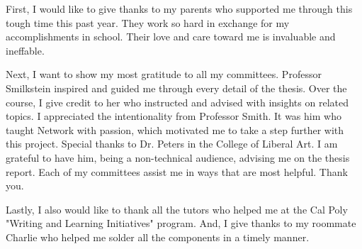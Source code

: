 \noindent
First, I would like to give thanks to my parents who supported me through this tough time this past year. They work so hard in exchange for my accomplishments in school. Their love and care toward me is invaluable and ineffable.

Next, I want to show my most gratitude to all my committees. Professor Smilkstein inspired and guided me through every detail of the thesis. Over the course, I give credit to her who instructed and advised with insights on related topics. I appreciated the intentionality from Professor Smith. It was him who taught Network with passion, which motivated me to take a step further with this project. Special thanks to Dr. Peters in the College of Liberal Art. I am grateful to have him, being a non-technical audience, advising me on the thesis report. Each of my committees assist me in ways that are most helpful. Thank you. 

Lastly, I also would like to thank all the tutors who helped me at the Cal Poly "Writing and Learning Initiatives" program. And, I give thanks to my roommate Charlie who helped me solder all the components in a timely manner. 



